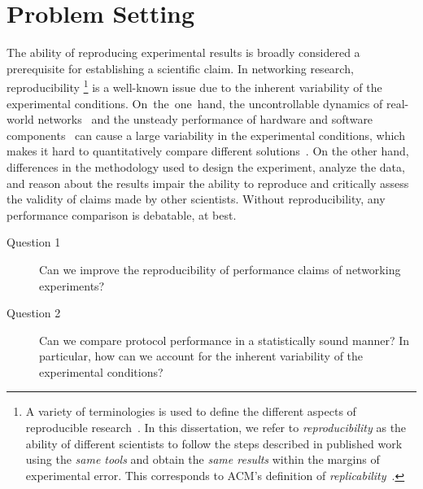 
\section{Problem Setting}
\label{sec:triscale_intro}
The ability of reproducing experimental results is broadly considered a prerequisite for establishing a scientific claim.
In networking research, reproducibility%
\footnote{
A variety of terminologies is used to define the different aspects of reproducible research~\cite{plesser18terminology, barba2018Terminologies}.
In this dissertation, we refer to \emph{reproducibility} as the ability of different scientists to follow the steps described in published work using the \emph{same tools} and obtain the \emph{same results} within the margins of experimental error. This corresponds to ACM's definition of \emph{replicability}~\cite{acmBadges}.}
is a well-known issue due to the inherent variability of the experimental \mbox{conditions}.
\mbox{On the one hand}, the uncontrollable dynamics of real-world networks~\cite{matos18reproducible, burchfield09rfjungle} and the unsteady performance of hardware and software components~\cite{maricq2018Taming, blackburn2016Truth} can cause a large variability in the experimental conditions, which makes it hard to quantitatively compare different solutions~\cite{bajpai18dagstuhl_report}.
\linebreak
On the other hand, differences in the methodology used to design the experiment, analyze the data, and reason about the results impair the ability to reproduce and critically assess the validity of claims  made by other scientists.
Without reproducibility, any performance comparison is debatable, at best.

\begin{research_questions}
  \begin{description}

    \item[Question 1]
    Can we improve the reproducibility of performance claims of networking experiments?

    \item[Question 2]
  	Can we compare protocol performance in a statistically sound manner? In particular, how can we account for the inherent variability of the experimental conditions?
  \end{description}
\end{research_questions}


